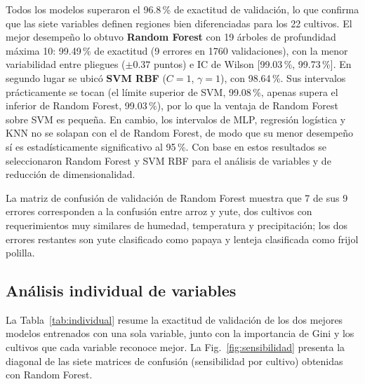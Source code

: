 \documentclass[conference]{IEEEtran}
\begin{document}
Todos los modelos superaron el 96.8\,\% de exactitud de validación, lo que confirma que las siete variables definen regiones bien diferenciadas para los 22 cultivos. El mejor desempeño lo obtuvo \textbf{Random Forest} con 19 árboles de profundidad máxima 10: 99.49\,\% de exactitud (9 errores en 1760 validaciones), con la menor variabilidad entre pliegues ($\pm 0.37$ puntos) e IC de Wilson [99.03\,\%, 99.73\,\%]. En segundo lugar se ubicó \textbf{SVM RBF} ($C=1$, $\gamma=1$), con 98.64\,\%. Sus intervalos prácticamente se tocan (el límite superior de SVM, 99.08\,\%, apenas supera el inferior de Random Forest, 99.03\,\%), por lo que la ventaja de Random Forest sobre SVM es pequeña. En cambio, los intervalos de MLP, regresión logística y KNN no se solapan con el de Random Forest, de modo que su menor desempeño sí es estadísticamente significativo al 95\,\%. Con base en estos resultados se seleccionaron Random Forest y SVM RBF para el análisis de variables y de reducción de dimensionalidad.

La matriz de confusión de validación de Random Forest muestra que 7 de sus 9 errores corresponden a la confusión entre arroz y yute, dos cultivos con requerimientos muy similares de humedad, temperatura y precipitación; los dos errores restantes son yute clasificado como papaya y lenteja clasificada como frijol polilla.

\subsection{Análisis individual de variables}

La Tabla~\ref{tab:individual} resume la exactitud de validación de los dos mejores modelos entrenados con una sola variable, junto con la importancia de Gini y los cultivos que cada variable reconoce mejor. La Fig.~\ref{fig:sensibilidad} presenta la diagonal de las siete matrices de confusión (sensibilidad por cultivo) obtenidas con Random Forest.
\end{document}

